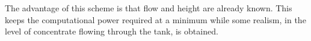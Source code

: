 The advantage of this scheme is that flow and height are already known. This keeps the computational power required at a minimum while some realism, in the level of concentrate flowing through the tank, is obtained.






